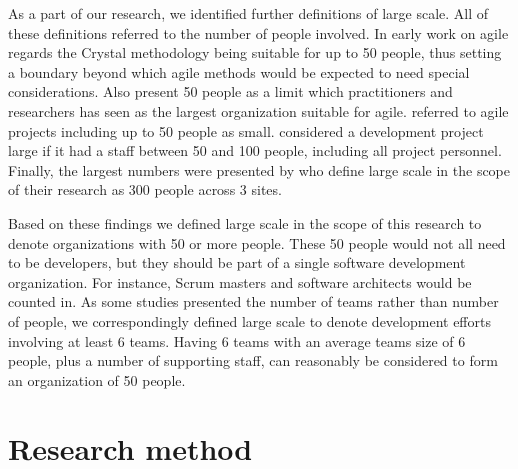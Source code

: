 As a part of our research, we identified further definitions of large scale. All
of these definitions referred to the number of people involved.
In early work on agile \citet{Fowler2000} regards the Crystal methodology being
suitable for up to 50 people, thus setting a boundary beyond which agile methods
would be expected to need special considerations. Also \citet{Williams2003}
present 50 people as a limit which practitioners and researchers has seen as the
largest organization suitable for agile.
\citet{Koehnemann2009} referred to agile projects including up to 50 people as
small. \citet{Elshamy2006} considered a development project large if it had a
staff between 50 and 100 people, including all project personnel. Finally, the
largest numbers were presented by \citet{Moore2008} who define large scale in
the scope of their research as 300 people across 3 sites.

Based on these findings we defined large scale in the scope of this research to
denote organizations with 50 or more people. These 50 people would not all need
to be developers, but they should be part of a single software development
organization. For instance, Scrum masters and software architects would be
counted in. As some studies presented the number of teams rather than number of
people, we correspondingly defined large scale to denote development efforts
involving at least 6 teams. Having 6 teams with an average teams size of 6
people, plus a number of supporting staff, can reasonably be considered to form
an organization of 50 people.


% 



\clearpage

\chapter{Research method}
\label{sec:method}

